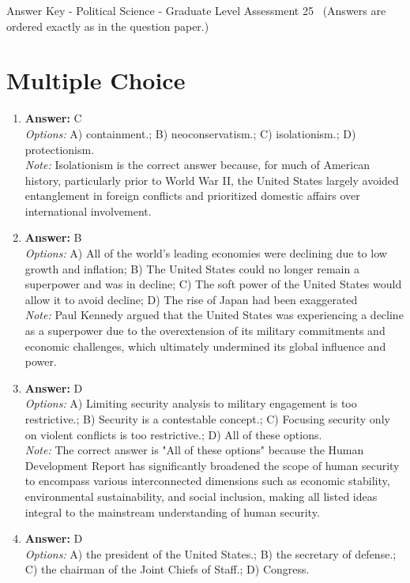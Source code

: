 \documentclass[12pt]{article}
\begin{document}
\begin{center}
Answer Key - Political Science - Graduate Level Assessment 25 \
\small (Answers are ordered exactly as in the question paper.)
\end{center}

\section*{Multiple Choice}
\begin{enumerate}[label=\arabic*.]
\item \textbf{Answer:} C
\\ \textit{Options:} A) containment.; B) neoconservatism.; C) isolationism.; D) protectionism.
\\ \textit{Note:} Isolationism is the correct answer because, for much of American history, particularly prior to World War II, the United States largely avoided entanglement in foreign conflicts and prioritized domestic affairs over international involvement.
\item \textbf{Answer:} B
\\ \textit{Options:} A) All of the world's leading economies were declining due to low growth and inflation; B) The United States could no longer remain a superpower and was in decline; C) The soft power of the United States would allow it to avoid decline; D) The rise of Japan had been exaggerated
\\ \textit{Note:} Paul Kennedy argued that the United States was experiencing a decline as a superpower due to the overextension of its military commitments and economic challenges, which ultimately undermined its global influence and power.
\item \textbf{Answer:} D
\\ \textit{Options:} A) Limiting security analysis to military engagement is too restrictive.; B) Security is a contestable concept.; C) Focusing security only on violent conflicts is too restrictive.; D) All of these options.
\\ \textit{Note:} The correct answer is "All of these options" because the Human Development Report has significantly broadened the scope of human security to encompass various interconnected dimensions such as economic stability, environmental sustainability, and social inclusion, making all listed ideas integral to the mainstream understanding of human security.
\item \textbf{Answer:} D
\\ \textit{Options:} A) the president of the United States.; B) the secretary of defense.; C) the chairman of the Joint Chiefs of Staff.; D) Congress.

\end{enumerate}
\end{document}
